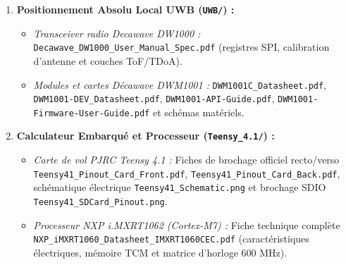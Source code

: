 \documentclass[../Materiel.tex]{subfiles}
\begin{document}
\begin{enumerate}
    \item \textbf{Positionnement Absolu Local UWB (\texttt{UWB/}) :}
    \begin{itemize}
        \item \textit{Transceiver radio Decawave DW1000 :} \texttt{Decawave\_DW1000\_User\_Manual\_Spec.pdf} (registres SPI, calibration d'antenne et couches ToF/TDoA).
        \item \textit{Modules et cartes Décawave DWM1001 :} \texttt{DWM1001C\_Datasheet.pdf}, \texttt{DWM1001-DEV\_Datasheet.pdf}, \texttt{DWM1001-API-Guide.pdf}, \texttt{DWM1001-Firmware-User-Guide.pdf} et schémas matériels.
    \end{itemize}

    \item \textbf{Calculateur Embarqué et Processeur (\texttt{Teensy\_4.1/}) :}
    \begin{itemize}
        \item \textit{Carte de vol PJRC Teensy 4.1 :} Fiches de brochage officiel recto/verso \texttt{Teensy41\_Pinout\_Card\_Front.pdf}, \texttt{Teensy41\_Pinout\_Card\_Back.pdf}, schématique électrique \texttt{Teensy41\_Schematic.png} et brochage SDIO \texttt{Teensy41\_SDCard\_Pinout.png}.
        \item \textit{Processeur NXP i.MXRT1062 (Cortex-M7) :} Fiche technique complète \texttt{NXP\_iMXRT1060\_Datasheet\_IMXRT1060CEC.pdf} (caractéristiques électriques, mémoire TCM et matrice d'horloge 600 MHz).
    \end{itemize}
\end{enumerate}
\end{document}
